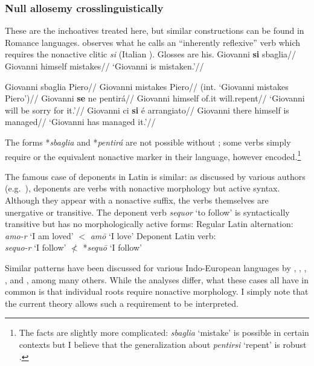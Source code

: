 {	\subsubsection{Null allosemy crosslinguistically}
These are the inchoatives treated here, but similar constructions can be found in Romance languages. \cite{burzio86} observes what he calls an ``inherently reflexive'' verb which requires the nonactive clitic \emph{si} (Italian ). Glosses are his.
\pex
	\a \begingl
		\gla Giovanni \textbf{si} sbaglia//
		\glb Giovanni himself mistakes//
		\glft `Giovanni is mistaken.'//
	\endgl
	
	\a \ljudge{*} \begingl
		\gla Giovanni sbaglia Piero//
		\glb Giovanni mistakes Piero//
		\glft (int. `Giovanni mistakes Piero')//
	\endgl
\xe
\ex
	\begingl
		\gla Giovanni \textbf{se} ne pentir\'a//
		\glb Giovanni himself of.it will.repent//
		\glft `Giovanni will be sorry for it.'//
	\endgl
\xe
\ex
	\begingl
		\gla Giovanni ci \textbf{si} \'e arrangiato//
		\glb Giovanni there himself is managed//
		\glft `Giovanni has managed it.'//
	\endgl
\xe

The forms *\emph{sbaglia} and *\emph{pentir\'a} are not possible without ; some verbs simply require  or the equivalent nonactive marker in their language, however encoded.\footnote{The facts are slightly more complicated: \emph{sbaglia} `mistake' is possible in certain contexts but I believe that the generalization about \emph{pentirsi} `repent' is robust \citep[40]{burzio86}.}

The famous case of deponents in Latin is similar: as discussed by various authors (e.g.~\citealt{xuetal07}), deponents are verbs with nonactive morphology but active syntax. Although they appear with a nonactive suffix, the verbs themselves are unergative or transitive. The deponent verb \emph{sequor} `to follow' is syntactically transitive but has no morphologically active forms:
\pex
    \a Regular Latin alternation:\\
        \emph{amo-r} `I am loved' $<$ \emph{am\=o} `I love'
    \a Deponent Latin verb:\\
        \emph{sequo-r} `I follow' $\nless$ *\emph{sequ\=o} `I follow'
\xe

Similar patterns have been discussed for various Indo-European languages by \cite{aronoff94}, \cite{embick04}, \cite{kallulli13}, \cite{wood15springer}, \cite{kastnerzu17} and \cite{grestenberger18}, among many others. While the analyses differ, what these cases all have in common is that individual roots require nonactive morphology. I simply note that the current theory allows such a requirement to be interpreted.

}
